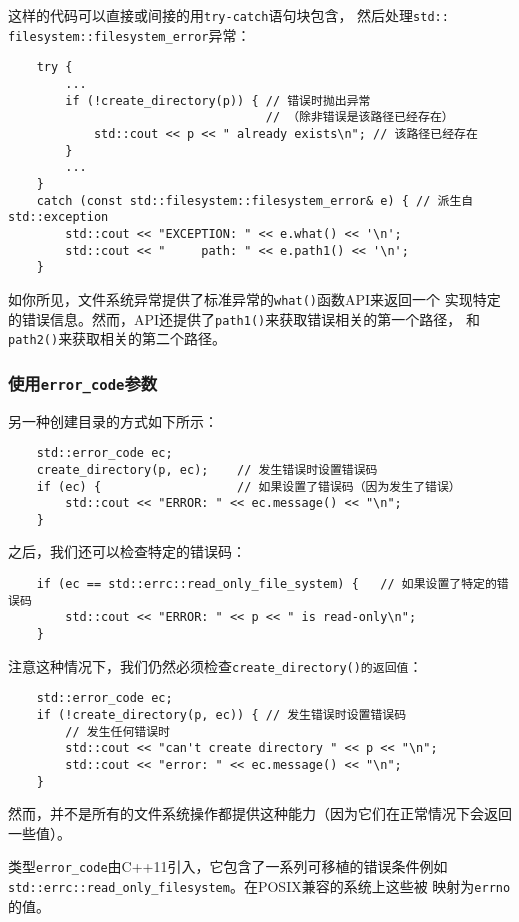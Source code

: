 这样的代码可以直接或间接的用\texttt{try-catch}语句块包含，
然后处理\texttt{std::\\
filesystem::filesystem\_error}异常：
\begin{lstlisting}
    try {
        ...
        if (!create_directory(p)) { // 错误时抛出异常
                                    // （除非错误是该路径已经存在）
            std::cout << p << " already exists\n"; // 该路径已经存在
        }
        ...
    }
    catch (const std::filesystem::filesystem_error& e) { // 派生自std::exception
        std::cout << "EXCEPTION: " << e.what() << '\n';
        std::cout << "     path: " << e.path1() << '\n';
    }
\end{lstlisting}
如你所见，文件系统异常提供了标准异常的\texttt{what()}函数API来返回一个
实现特定的错误信息。然而，API还提供了\texttt{path1()}来获取错误相关的第一个路径，
和\texttt{path2()}来获取相关的第二个路径。

\subsubsection*{使用\texttt{error\_code}参数}
另一种创建目录的方式如下所示：
\begin{lstlisting}
    std::error_code ec;
    create_directory(p, ec);    // 发生错误时设置错误码
    if (ec) {                   // 如果设置了错误码（因为发生了错误）
        std::cout << "ERROR: " << ec.message() << "\n";
    }
\end{lstlisting}
之后，我们还可以检查特定的错误码：
\begin{lstlisting}
    if (ec == std::errc::read_only_file_system) {   // 如果设置了特定的错误码
        std::cout << "ERROR: " << p << " is read-only\n";
    }
\end{lstlisting}
注意这种情况下，我们仍然必须检查\texttt{create\_directory()的返回值}：
\begin{lstlisting}
    std::error_code ec;
    if (!create_directory(p, ec)) { // 发生错误时设置错误码
        // 发生任何错误时
        std::cout << "can't create directory " << p << "\n";
        std::cout << "error: " << ec.message() << "\n";
    }
\end{lstlisting}
然而，并不是所有的文件系统操作都提供这种能力（因为它们在正常情况下会返回一些值）。

类型\texttt{error\_code}由C++11引入，它包含了一系列可移植的错误条件例如
\texttt{std::errc::read\_only\_filesystem}。在POSIX兼容的系统上这些被
映射为\texttt{errno}的值。

